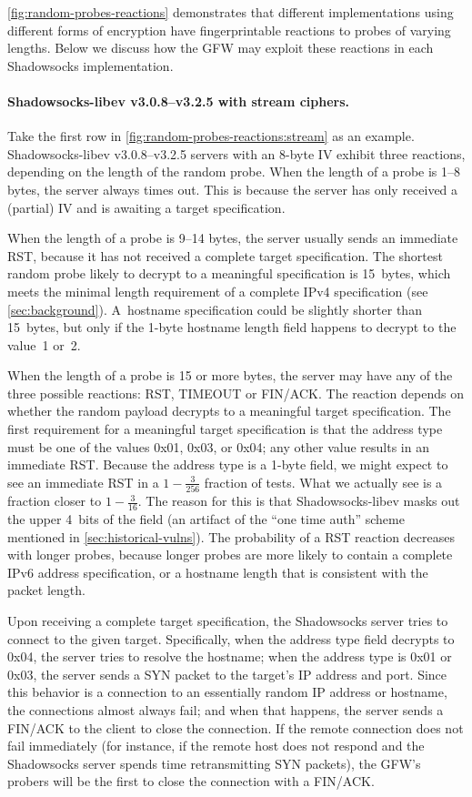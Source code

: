 \documentclass[sigconf,letterpaper]{acmart}
\begin{document}
\autoref{fig:random-probes-reactions} demonstrates that different implementations using different forms of encryption
have fingerprintable reactions to probes of varying lengths.
Below we discuss how the GFW may exploit these reactions
in each Shadowsocks implementation.

\paragraph{Shadowsocks-libev v3.0.8--v3.2.5 with stream ciphers.}
Take the first row in \autoref{fig:random-probes-reactions:stream}
as an example.
Shadowsocks-libev v3.0.8--v3.2.5 servers with an 8-byte IV
exhibit three reactions, depending on the length of the random probe.
When the length of a probe is 1--8 bytes,
the server always times out.
This is because the server has only received a (partial) IV
and is awaiting a target specification.

When the length of a probe is 9--14 bytes,
the server usually sends an immediate RST,
because it has not received a complete target specification.
The shortest random probe likely to decrypt to a meaningful specification is 15~bytes,
which meets the minimal length requirement of a complete IPv4 specification (see \autoref{sec:background}).
A~hostname specification could be slightly shorter than 15~bytes,
but only if the 1-byte hostname length field happens to decrypt to the value~1 or~2.

When the length of a probe is 15 or more bytes,
the server may have any of the three possible reactions:
RST, TIMEOUT or FIN/ACK.
The reaction depends on whether the random payload decrypts to a meaningful target specification.
The first requirement for a meaningful target specification is that the
address type must be one of the values 0x01, 0x03, or 0x04;
any other value results in an immediate RST.
Because the address type is a 1-byte field, we might expect
to see an immediate RST in a $1 - \frac{3}{256}$ fraction of tests.
What we actually see is a fraction closer to $1 - \frac{3}{16}$.
The reason for this is that Shadowsocks-libev masks out the upper 4~bits of the field
(an artifact of the ``one time auth'' scheme mentioned in \autoref{sec:historical-vulns}).
The probability of a RST reaction decreases with longer probes,
because longer probes are more likely to contain a complete IPv6 address specification,
or a hostname length that is consistent with the packet length.

Upon receiving a complete target specification,
the Shadowsocks server tries to connect to the given target.
Specifically, when the address type field decrypts to 0x04,
the server tries to resolve the hostname;
when the address type is 0x01 or 0x03,
the server sends a SYN packet to the target's IP address and port.
Since this behavior is a connection to an essentially random IP address or hostname,
the connections almost always fail;
and when that happens,
the server sends a FIN/ACK to the client to close the connection.
If the remote connection does not fail immediately
(for instance, if the remote host does not respond and the Shadowsocks server
spends time retransmitting SYN packets),
the GFW's probers will be the first to close the connection with a FIN/ACK.
\end{document}
